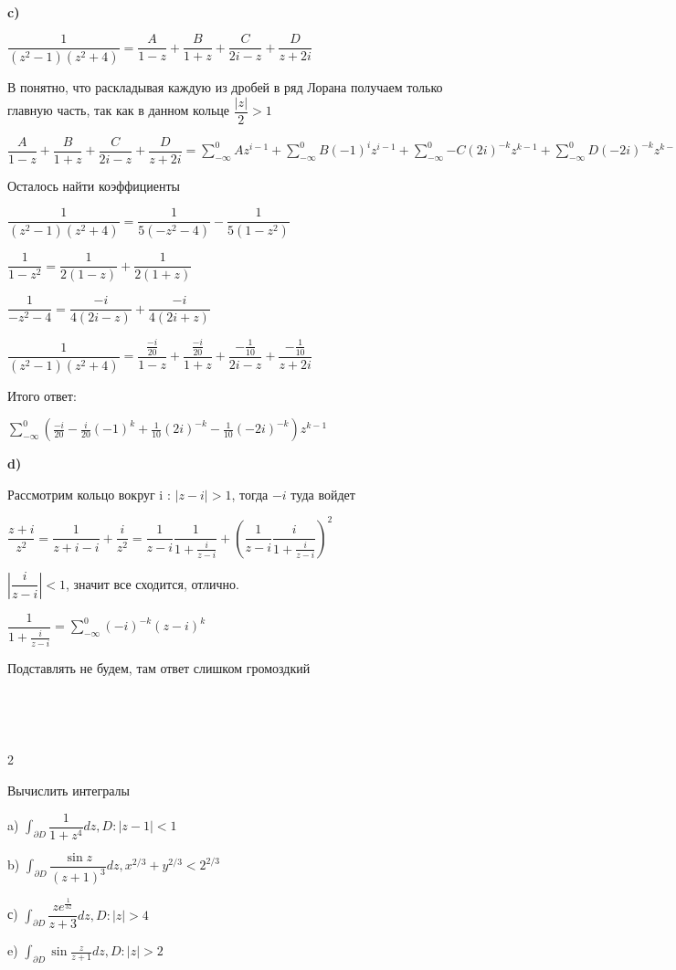 \begin{solution}
~\

\textbf{c)}

$\dfrac{1}{(z^2 - 1)(z^2 + 4)} = \dfrac{A}{1 - z} + \dfrac{B}{1 + z} + \dfrac{C}{2i - z} + \dfrac{D}{z + 2i}$

В понятно, что раскладывая каждую из дробей в ряд Лорана получаем только главную часть, так как в данном кольце $\dfrac{|z|}{2} > 1$

$\dfrac{A}{1 - z} + \dfrac{B}{1 + z} + \dfrac{C}{2i - z} + \dfrac{D}{z + 2i} = \sum\limits_{-\infty}^0{Az^{i - 1}} + \sum\limits_{-\infty}^0{B(-1)^iz^{i - 1}} + \sum\limits_{-\infty}^0{-C(2i)^{-k}z^{k - 1}} + \sum\limits_{-\infty}^0{D(-2i)^{-k}z^{k - 1}} = \sum\limits_{-\infty}^0{(A + B(-1)^k - C(2i)^{-k} + D(-2i)^{-k}) z^{k - 1}}$

Осталось найти коэффициенты

$\dfrac{1}{(z^2 - 1)(z^2 + 4)} = \dfrac{1}{5(-z^2 - 4)} - \dfrac{1}{5(1 - z^2)}$

$\dfrac{1}{1 - z^2} = \dfrac{1}{2(1 - z)} + \dfrac{1}{2(1 + z)}$

$\dfrac{1}{-z^2 - 4} = \dfrac{-i}{4(2i - z)} + \dfrac{-i}{4(2i + z)}$

$\dfrac{1}{(z^2 - 1)(z^2 + 4)} = \dfrac{\frac{-i}{20}}{1 - z} + \dfrac{\frac{-i}{20}}{1 + z} + \dfrac{-\frac{1}{10}}{2i - z} + \dfrac{-\frac{1}{10}}{z + 2i}$

Итого ответ:

$\sum\limits_{-\infty}^0{(\frac{-i}{20} - \frac{i}{20}(-1)^k + \frac{1}{10}(2i)^{-k} - \frac{1}{10}(-2i)^{-k}) z^{k - 1}}$

\textbf{d)}

Рассмотрим кольцо вокруг i : $|z - i| > 1$, тогда $-i$ туда войдет

$\dfrac{z + i}{z^2} = \dfrac{1}{z + i - i} + \dfrac{i}{z^2} = \dfrac{1}{z - i}\dfrac{1}{1 + \frac{i}{z - i}} + (\dfrac{1}{z - i}\dfrac{i}{1 + \frac{i}{z - i}})^2$

$|\dfrac{i}{z - i}| < 1$, значит все сходится, отлично.

$\dfrac{1}{1 + \frac{i}{z - i}} = \sum\limits_{-\infty}^0{(-i)^{-k}(z - i)^k}$

Подставлять не будем, там ответ слишком громоздкий

\end{solution}

~\

~\





\begin{problem}{2}

Вычислить интегралы

a) $\int_{\partial D}{\dfrac{1}{1 + z^4} dz}, D : |z - 1| < 1$

b) $\int_{\partial D}{\dfrac{\sin{z}}{(z + 1)^3} dz}, x^{2 / 3} + y^{2 / 3} < 2^{2 / 3}$

с) $\int_{\partial D}{\dfrac{ze^{\frac{1}{3z}}}{z + 3} dz}, D : |z| > 4$

e) $\int_{\partial D}{\sin{\frac{z}{z + 1}} dz}, D : |z| > 2$

\end{problem}

